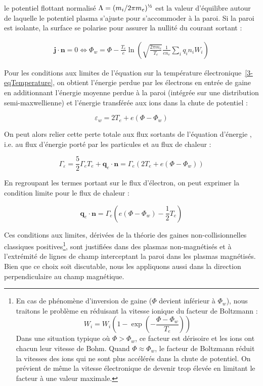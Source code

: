 \begin{refsection}
le potentiel flottant normalisé $\Lambda=({m_i}/{2\pi
m_e})^{\text{\textonehalf}}$ est la valeur d'équilibre autour de laquelle
le potentiel plasma s'ajuste pour s'accommoder à la paroi.
Si la paroi est isolante, la surface se polarise
pour assurer la nullité du courant sortant :

\begin{equation}\begin{split}
\mathbf j\cdot\mathbf{n}=0\Leftrightarrow
\Phi_w=\Phi-\frac{T_e}{e}\ln\left(\sqrt{\frac{2\pi
m_e}{T_e}}\frac{1}{en_e}\sum_iq_in_iW_i\right)
\end{split}\end{equation}

Pour les conditions aux limites de l'équation sur la température
électronique~\eqref{3-eqTemperature}, on obtient l'énergie perdue par les
électrons en entrée de gaine en additionnant l'énergie moyenne perdue à la paroi (intégrée sur une distribution semi-maxwellienne) et l'énergie transférée aux ions dans la chute de potentiel :

\begin{equation}
	\varepsilon_w=2T_e+e(\Phi-\Phi_w)
\end{equation}
 
 On peut alors relier cette perte totale aux flux sortants de l'équation
 d'énergie , i.e. au flux d'énergie porté
 par les particules et au flux de chaleur :
 
\begin{equation}
\Gamma_\varepsilon=\frac{5}{2}{\Gamma}_eT_e+\mathbf{q}_e\cdot\mathbf{n}=
\Gamma_e\left(2T_e+e(\Phi-\Phi_w)\right)
\end{equation}

En regroupant les termes portant sur le flux d'électron, on peut exprimer la
condition limite pour le flux de chaleur :

\begin{equation}
\mathbf{q}_e\cdot\mathbf{n}=\Gamma_e\left(e(\Phi-\Phi_w)-\frac{1}{2}T_e\right)
\end{equation}

Ces conditions aux limites, dérivées de la théorie des gaines
non-collisionnelles classiques positives\footnote{En cas de
phénomène d'inversion de gaine ($\Phi$ devient inférieur à $\Phi_w$), nous
traitons le problème en réduisant la vitesse ionique du facteur de Boltzmann :
$$W_i=W_i\left(1-\exp\left(-\frac{\Phi-\Phi_w}{T_e}\right)\right)$$
Dans une situation typique où $\Phi>\Phi_w$, ce facteur est dérisoire et les
ions ont chacun leur vitesse de Bohm. Quand $\Phi\approx\Phi_w$, le facteur de
Boltzmann réduit la vitesses des ions qui ne sont plus accélérés dans la chute
de potentiel. On prévient de même la vitesse électronique de devenir trop élevée
en limitant le facteur à une valeur maximale.}, sont justifiées dans des
plasmas non-magnétisés et à l'extrémité de lignes de champ interceptant la paroi dans les plasmas magnétisés. Bien que ce choix soit discutable, nous les appliquons aussi dans la direction perpendiculaire au champ magnétique.




\end{refsection}
